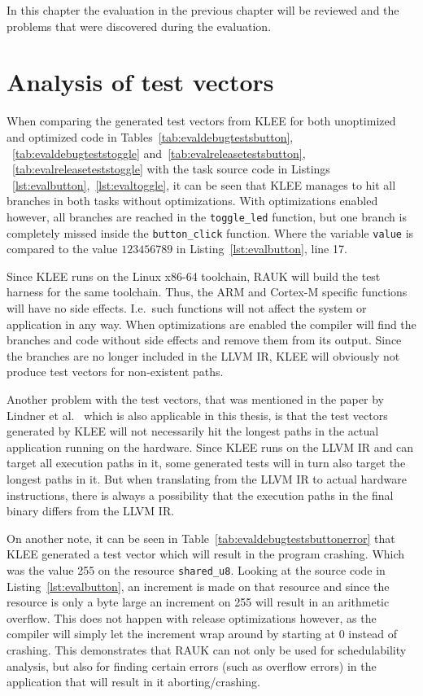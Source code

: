 In this chapter the evaluation in the previous chapter will be reviewed
and the problems that were discovered during the evaluation.

\section{Analysis of test vectors}
When comparing the generated test vectors from KLEE for both unoptimized and
optimized code in Tables~\ref{tab:evaldebugtestsbutton},
~\ref{tab:evaldebugteststoggle} and~\ref{tab:evalreleasetestsbutton},
~\ref{tab:evalreleaseteststoggle} with the task source code in Listings
~\ref{lst:evalbutton},~\ref{lst:evaltoggle}, it can be seen that KLEE manages to
hit all branches in both tasks without optimizations. With optimizations
enabled however, all branches are reached in the \texttt{toggle\_led} function,
but one branch is completely missed inside the \texttt{button\_click} function.
Where the variable \texttt{value} is compared to the value $123456789$ in
Listing~\ref{lst:evalbutton}, line 17.

Since KLEE runs on the Linux x86-64 toolchain, RAUK will build the test harness
for the same toolchain. Thus, the ARM and Cortex-M specific functions will have
no side effects. I.e.\ such functions will not affect the system or application
in any way. When optimizations are enabled the compiler will find the branches
and code without side effects and remove them from its output. Since the
branches are no longer included in the LLVM IR, KLEE will obviously not
produce test vectors for non-existent paths.

Another problem with the test vectors, that was mentioned in the paper by
Lindner et al.\ \cite{lindner} which is also applicable in this thesis, is that
the test vectors generated by KLEE will not necessarily hit the longest paths
in the actual application running on the hardware. Since KLEE runs on the LLVM
IR and can target all execution paths in it, some generated tests will
in turn also target the longest paths in it. But when translating from the LLVM
IR to actual hardware instructions, there is always a possibility that the
execution paths in the final binary differs from the LLVM IR\@.

On another note, it can be seen in Table~\ref{tab:evaldebugtestsbuttonerror}
that KLEE generated a test vector which will result in the program crashing.
Which was the value 255 on the resource \texttt{shared\_u8}. Looking at the
source code in Listing~\ref{lst:evalbutton}, an increment is made on that
resource and since the resource is only a byte large an increment on 255 will
result in an arithmetic overflow. This does not happen with release
optimizations however, as the compiler will simply let the increment wrap
around by starting at 0 instead of crashing. This demonstrates that RAUK
can not only be used for schedulability analysis, but also for finding
certain errors (such as overflow errors) in the application that will result
in it aborting/crashing.


